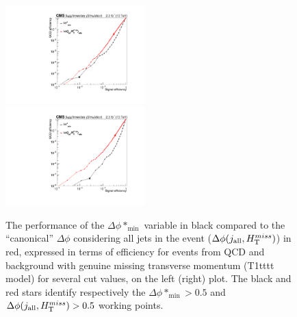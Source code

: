 \clearpage
\begin{figure}[tbhp]
    \caption{ 
    The performance of the $\Delta\phi*_{\mathrm{min}}$ variable in black compared to the ``canonical'' $\Delta\phi$ 
    considering all jets in the event ($\Delta\phi(j_{\mathrm{all}},H_{\mathrm{T}}^{miss})$) in red, 
    expressed in terms of efficiency for events from QCD and background with genuine missing transverse momentum (T1tttt model) 
    for several cut values, on the left (right) plot. 
    The black and red stars identify respectively the $\Delta\phi*_{\mathrm{min}}>0.5$ and $\Delta\phi(j_{\mathrm{all}},H_{\mathrm{T}}^{miss})>0.5$ working points. 
    \label{fig:bDPhi-ROC} }
  \begin{center}
     \includegraphics[width=0.48\textwidth]{figures/ewk_ht800} ~~
     \includegraphics[width=0.48\textwidth]{figures/T1tttt_uncomp_ht800}
  \end{center}
\end{figure}




